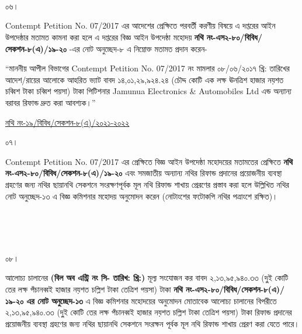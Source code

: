 \documentclass[12pt]{article}
\newcommand{\fileno}{নথি নং-১৯/বিবিধ/সেকশন-৮(এ)/২০২১-২০২২}
\newcommand{\tvat}{১৪,০১,২৯,৯২৪.২৪ (চৌদ্দ কোটি এক লক্ষ ঊনত্রিশ হাজার নয়শত চব্বিশ টাকা চব্বিশ পয়সা) টাকা}
\newcommand{\tvat}{২,১৩,৯৫,৯৪০.৩৩ (দু্ই কোটি তের লক্ষ পঁচানব্বই হাজার নয়শত চল্লিশ টাকা তেত্রিশ পয়সা) টাকা}
\newcommand{\vat}{২,১৩,৯৫,৯৪০.৩৩ (দু্ই কোটি তের লক্ষ পঁচানব্বই হাজার নয়শত চল্লিশ টাকা তেত্রিশ পয়সা) টাকা}
\newcommand{\cno}{}
\newcommand{\dt}{}
\begin{document}
\\
\\
\\
\begin{minipage}[t]{0.05\linewidth}
০৬।
\end{minipage}
\begin{minipage}[t]{1\linewidth}
Contempt Petition No. 07/2017
এর আদেশের প্রেক্ষিতে পরবর্তী
করণীয় বিষয়ে এ দপ্তরের আইন
উপদেষ্ঠার মতামত কামনা করা হলে এ দপ্তরের
বিজ্ঞ আইন উপদেষ্ঠা মহোদয়
\textbf{নথি নং-এস২-৮০/বিবিধ/সেকশন-৮(এ)/১৯-২০}
-এর নোট অনুচ্ছেদ-৮ এ নিম্নোক্ত মতামত প্রদান করেন-


\hspace{1em}``মাননীয় আপীল বিভাগের
Contempt Petition No. 07/2017
নং মামলার ০৮/০৬/২০১৭ খ্রি: তারিখের
আদেশ/রায়ের আলোকে আহরিত ভ্যাট বাবদ
{\tvat} পিটিশনার
Jamunua Electronics \& Automobiles Ltd
এন্ড অন্যান্য বরাবর রিফান্ড
দ্রুত করা আবশ্যক।''
\end{minipage}
\newpage
\begin{minipage}[t]{0.59\linewidth}
\hspace{0.5em}
\end{minipage}
\begin{minipage}[t]{1\textwidth}
\underline{
{\fileno}
}
\end{minipage}
\begin{minipage}[t]{0.05\linewidth}
০৭।
\end{minipage}
\begin{minipage}[t]{1\linewidth}
Contempt Petition No. 07/2017
এর প্রেক্ষিতে বিজ্ঞ আইন উপদেষ্ঠা মহোদয়ের
মতামতের প্রেক্ষিতে
\textbf{নথি নং-এস২-৮০/বিবিধ/সেকশন-৮(এ)/১৯-২০}
এবং সমজাতীয় অন্যান্য নথির
রিফান্ড প্রদানের প্রয়োজনীয় ব্যবস্থা গ্রহণের
জন্য নথির ছায়ানথি সেকশনে
সংরক্ষণপূর্বক মূল নথি রিফান্ড
শাখায় প্রেরণের প্রস্তাব করা হলে উল্লিখিত নথির
নোট অনুচ্ছেদ-১৩ এ বিজ্ঞ কমিশনার মহোদয় অনুমোদন
করেন (নোটাংশের ফটোকপি নথির পত্রাংশে রক্ষিত)।
\end{minipage}
\\
\\
\\
\begin{minipage}[t]{0.05\linewidth}
০৮।
\end{minipage}
\begin{minipage}[t]{1\linewidth}
আলোচ্য চালানের
\textbf{(বিল অব এন্ট্রি নং সি-{\cno} তারিখ: {\dt} খ্রি:)} মূল্য সংযোজন কর বাবদ
{\vat} \textbf{নথি নং-এস২-৮০/বিবিধ/সেকশন-৮(এ)/১৯-২০
এর নোট অনুচ্ছেদ-১৩} এ বিজ্ঞ কমিশনার মহোদয়ের
অনুমোদন মোতাবেক আলোচ্য চালানের
বিপরীতে
{\vat} রিফান্ড প্রদানের প্রয়োজনীয় ব্যবস্থা গ্রহণের জন্য
নথির ছায়ানথি সেকশনে সংরক্ষন পূর্বক
মূল নথি রিফান্ড শাখায় প্রেরণ করা যেতে পারে।
\end{minipage}



\thispagestyle{laststyle}
\end{document}
